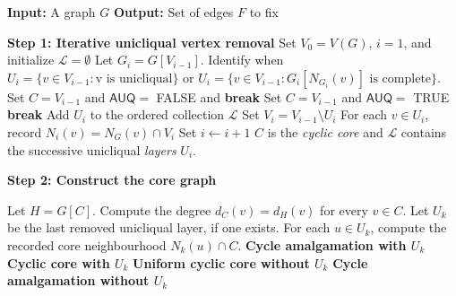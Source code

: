 \documentclass[11pt]{article}
\begin{document}
\begin{algorithm}\caption{Cyclic-Core Root Reconstruction} \label{algo::cyclic_core_reconstruction_1}
  \begin{algorithmic}[1]
    \State \textbf{Input:} A graph $G$
    \State \textbf{Output:} Set of edges $F$ to fix

    \vspace{0.5em}

    \Statex \textbf{Step 1: Iterative unicliqual vertex removal}
    \State Set $V_0 = V(G)$, $i=1$, and initialize $\mathcal{L}=\emptyset$
      \State Let $G_i=G[V_{i-1}]$. 
      \State Identify when $U_i=\{v\in V_{i-1}: \text{v is unicliqual} \}$ or $U_i=\{v\in V_{i-1}: G_i[N_{G_i}(v)]\text{ is complete}\}$.
          \State Set $C=V_{i-1}$ and $\mathsf{AUQ}=$ FALSE and \textbf{break}
          \State Set $C=V_{i-1}$ and $\mathsf{AUQ}=$ TRUE \textbf{break}
      \Else
          \State Add $U_i$ to the ordered collection $\mathcal{L}$
          \State Set $V_i=V_{i-1}\setminus U_i$
          \State For each $v\in U_i$, record $N_i(v)=N_G(v) \cap V_i$
          \State Set $i\leftarrow i+1$
      \EndIf
    \EndWhile
    \State $C$ is the \emph{cyclic core} and $\mathcal{L}$ contains the successive unicliqual \emph{layers} $U_i$.

    \vspace{0.5em}

    \Statex \textbf{Step 2: Construct the core graph}

    \State Let $H=G[C]$.
    \State Compute the degree $d_C(v)=d_H(v)$ for every $v\in C$.
    \State Let $U_k$ be the last removed unicliqual layer, if one exists.
        \State For each $u\in U_k$, compute the recorded core neighbourhood $N_k(u)\cap C$.
            \State \textbf{Cycle amalgamation with $U_k$}
        \Else
            \State \textbf{Cyclic core with $U_k$}
        \EndIf
    \Else
            \State \textbf{Uniform cyclic core without $U_k$}
        \Else
            \State \textbf{Cycle amalgamation without $U_k$}
        \EndIf
    \EndIf
  \end{algorithmic}
\end{algorithm}
\end{document}
